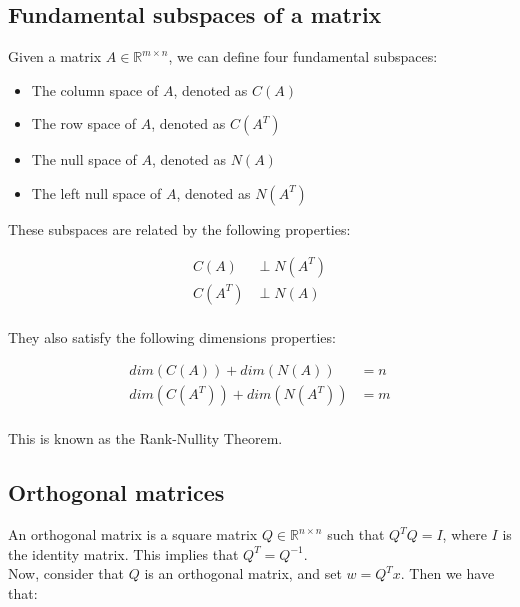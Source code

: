 \subsection{Fundamental subspaces of a matrix}

Given a matrix $A \in \mathbb{R}^{m \times n}$, we can define four fundamental subspaces:

\begin{itemize}
    \item The column space of $A$, denoted as $C(A)$
    \item The row space of $A$, denoted as $C(A^T)$
    \item The null space of $A$, denoted as $N(A)$
    \item The left null space of $A$, denoted as $N(A^T)$
\end{itemize}

These subspaces are related by the following properties:

\begin{equation}
    \begin{aligned}
        C(A) &\perp N(A^T) \\
        C(A^T) &\perp N(A) \\
    \end{aligned}
\end{equation}

They also satisfy the following dimensions properties:

\begin{equation}
    \begin{aligned}
        dim(C(A)) + dim(N(A)) &= n \\
        dim(C(A^T)) + dim(N(A^T)) &= m \\
    \end{aligned}
\end{equation}

This is known as the Rank-Nullity Theorem.

\subsection{Orthogonal matrices}

An orthogonal matrix is a square matrix $Q \in \mathbb{R}^{n \times n}$ such that $Q^T Q = I$, where $I$ is the identity matrix.
This implies that $Q^T = Q^{-1}$.\\

Now, consider that $Q$ is an orthogonal matrix, and set $w = Q^T x$. Then we have that:

